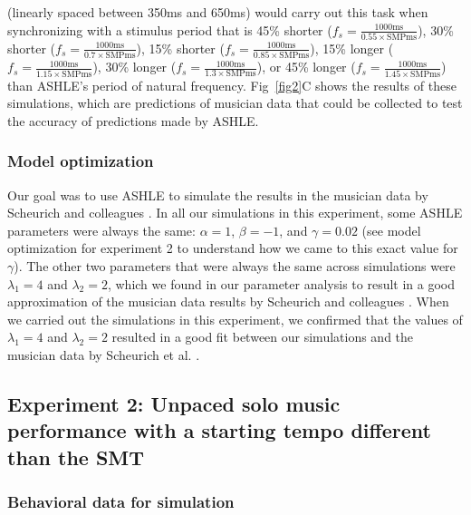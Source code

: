 \documentclass[10pt,letterpaper]{article}
\begin{document}
(linearly spaced between 350ms and 650ms) would carry out this task when synchronizing with a stimulus period that is 45\% shorter ($f_s=\frac{1000 \text{ms}}{0.55 \times \text{SMPms}}$), 30\% shorter ($f_s=\frac{1000 \text{ms}}{0.7 \times \text{SMPms}}$), 15\% shorter ($f_s=\frac{1000 \text{ms}}{0.85 \times \text{SMPms}}$), 15\% longer ($f_s=\frac{1000 \text{ms}}{1.15 \times \text{SMPms}}$), 30\% longer ($f_s=\frac{1000 \text{ms}}{1.3 \times \text{SMPms}}$), or 45\% longer ($f_s=\frac{1000 \text{ms}}{1.45 \times \text{SMPms}}$) than ASHLE's period of natural frequency. Fig~\ref{fig2}C shows the results of these simulations, which are predictions of musician data that could be collected to test the accuracy of predictions made by ASHLE.

\subsubsection*{Model optimization}

Our goal was to use ASHLE to simulate the results in the musician data by Scheurich and colleagues \cite{scheurich2018tapping}. In all our simulations in this experiment, some ASHLE parameters were always the same: $\alpha=1$, $\beta=-1$, and $\gamma=0.02$ (see model optimization for experiment 2 to understand how we came to this exact value for $\gamma$). The other two parameters that were always the same across simulations were $\lambda_1=4$ and $\lambda_2=2$, which we found in our parameter analysis to result in a good approximation of the musician data results by Scheurich and colleagues \cite{scheurich2018tapping}. When we carried out the simulations in this experiment, we confirmed that the values of $\lambda_1=4$ and $\lambda_2=2$ resulted in a good fit between our simulations and the musician data by Scheurich et al. \cite{scheurich2018tapping}.

\subsection*{Experiment 2: Unpaced solo music performance with a starting tempo different than the SMT}

\subsubsection*{Behavioral data for simulation}
\end{document}
